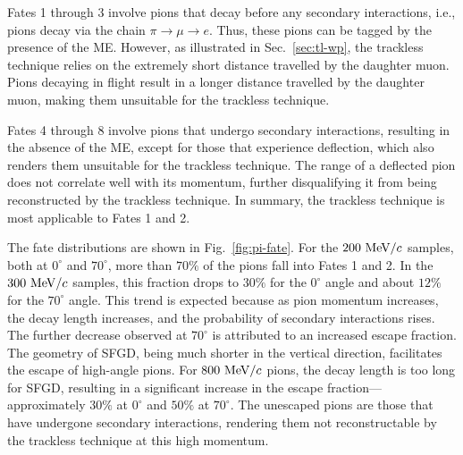           Fates 1 through 3 involve pions that decay before any secondary interactions, i.e., pions decay via the chain $\pi \rightarrow \mu \rightarrow e$. 
          Thus, these pions can be tagged by the presence of the ME. 
          However, as illustrated in Sec.~\ref{sec:tl-wp}, the trackless technique relies on the extremely short distance travelled by the daughter muon. 
          Pions decaying in flight result in a longer distance travelled by the daughter muon, making them unsuitable for the trackless technique.

          Fates 4 through 8 involve pions that undergo secondary interactions, resulting in the absence of the ME, except for those that experience deflection, which also renders them unsuitable for the trackless technique. 
          The range of a deflected pion does not correlate well with its momentum, further disqualifying it from being reconstructed by the trackless technique. 
          In summary, the trackless technique is most applicable to Fates 1 and 2.

          The fate distributions are shown in Fig.~\ref{fig:pi-fate}. 
          For the $200~\textrm{MeV}/c$ samples, both at $0^\circ$ and $70^\circ$, more than $70\%$ of the pions fall into Fates 1 and 2. 
          In the $300~\textrm{MeV}/c$ samples, this fraction drops to $30\%$ for the $0^\circ$ angle and about $12\%$ for the $70^\circ$ angle. 
          This trend is expected because as pion momentum increases, the decay length increases, and the probability of secondary interactions rises. 
          The further decrease observed at $70^\circ$ is attributed to an increased escape fraction. 
          The geometry of SFGD, being much shorter in the vertical direction, facilitates the escape of high-angle pions. 
          For $800~\textrm{MeV}/c$ pions, the decay length is too long for SFGD, resulting in a significant increase in the escape fraction—approximately $30\%$ at $0^\circ$ and $50\%$ at $70^\circ$. 
          The unescaped pions are those that have undergone secondary interactions, rendering them not reconstructable by the trackless technique at this high momentum.

